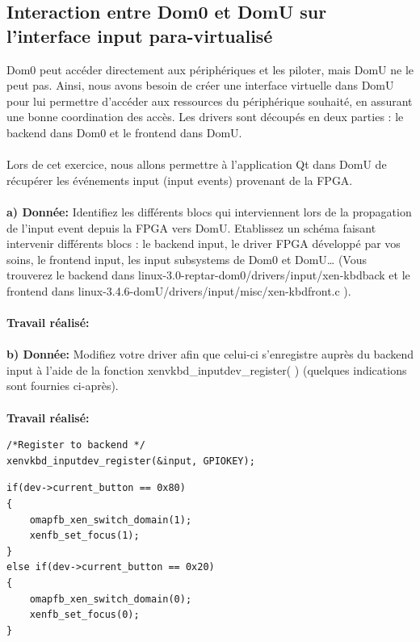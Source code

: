 \subsection{Interaction entre Dom0 et DomU sur l'interface input para-virtualisé}
Dom0 peut accéder directement aux périphériques et les piloter, mais DomU ne le peut pas. Ainsi, nous
avons besoin de créer une interface virtuelle dans DomU pour lui permettre d’accéder aux ressources
du périphérique souhaité, en assurant une bonne coordination des accès. Les drivers sont découpés en
deux parties : le backend dans Dom0 et le frontend dans DomU.\\\\
Lors de cet exercice, nous allons permettre à l’application Qt dans DomU de récupérer les événements
input (input events) provenant de la FPGA.\\\\
\textbf{a) Donnée: }Identifiez les différents blocs qui interviennent lors de la propagation de l’input event depuis la
FPGA vers DomU. Etablissez un schéma faisant intervenir différents blocs : le backend input, le
driver FPGA développé par vos soins, le frontend input, les input subsystems de Dom0 et DomU…
(Vous trouverez le backend dans linux-3.0-reptar-dom0/drivers/input/xen-kbdback et le frontend
dans linux-3.4.6-domU/drivers/input/misc/xen-kbdfront.c ).\\\\
\textbf{Travail réalisé: }\\\\
\textbf{b) Donnée: }Modifiez votre driver afin que celui-ci s'enregistre auprès du backend input à l'aide de la fonction
xenvkbd\_inputdev\_register( ) (quelques indications sont fournies ci-après).\\\\
\textbf{Travail réalisé: }
\begin{lstlisting}
/*Register to backend */
xenvkbd_inputdev_register(&input, GPIOKEY);
\end{lstlisting}
\begin{lstlisting}
if(dev->current_button == 0x80)
{
	omapfb_xen_switch_domain(1);
	xenfb_set_focus(1);
}
else if(dev->current_button == 0x20)
{
	omapfb_xen_switch_domain(0);
	xenfb_set_focus(0);
}
\end{lstlisting}
